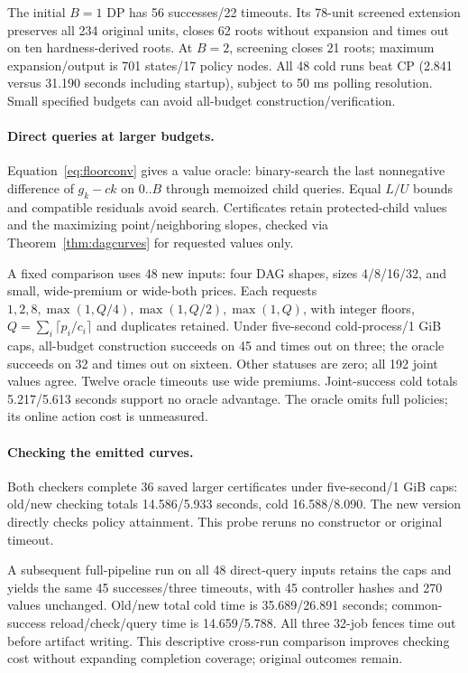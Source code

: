 \documentclass[acmsmall,screen,review,anonymous]{acmart}
\begin{document}
The initial $B=1$ DP has 56 successes/22 timeouts. Its 78-unit screened extension preserves all 234 original units, closes 62 roots without expansion and times out on ten hardness-derived roots. At $B=2$, screening closes 21 roots; maximum expansion/output is 701 states/17 policy nodes. All 48 cold runs beat CP (2.841 versus 31.190 seconds including startup), subject to 50 ms polling resolution. Small specified budgets can avoid all-budget construction/verification.

\paragraph{Direct queries at larger budgets.}
Equation~\eqref{eq:floorconv} gives a value oracle: binary-search the last nonnegative difference of $g_k-ck$ on $0..B$ through memoized child queries. Equal $L/U$ bounds and compatible residuals avoid search. Certificates retain protected-child values and the maximizing point/neighboring slopes, checked via Theorem~\ref{thm:dagcurves} for requested values only.

A fixed comparison uses 48 new inputs: four DAG shapes, sizes 4/8/16/32, and small, wide-premium or wide-both prices. Each requests $1,2,8,\max(1,Q/4),\max(1,Q/2),\max(1,Q)$, with integer floors, $Q=\sum_i\lceil p_i/c_i\rceil$ and duplicates retained. Under five-second cold-process/1 GiB caps, all-budget construction succeeds on 45 and times out on three; the oracle succeeds on 32 and times out on sixteen. Other statuses are zero; all 192 joint values agree. Twelve oracle timeouts use wide premiums. Joint-success cold totals 5.217/5.613 seconds support no oracle advantage. The oracle omits full policies; its online action cost is unmeasured.

\paragraph{Checking the emitted curves.}
Both checkers complete 36 saved larger certificates under five-second/1 GiB caps: old/new checking totals 14.586/5.933 seconds, cold 16.588/8.090. The new version directly checks policy attainment. This probe reruns no constructor or original timeout.

A subsequent full-pipeline run on all 48 direct-query inputs retains the caps and yields the same 45 successes/three timeouts, with 45 controller hashes and 270 values unchanged. Old/new total cold time is 35.689/26.891 seconds; common-success reload/check/query time is 14.659/5.788. All three 32-job fences time out before artifact writing. This descriptive cross-run comparison improves checking cost without expanding completion coverage; original outcomes remain.
\end{document}
